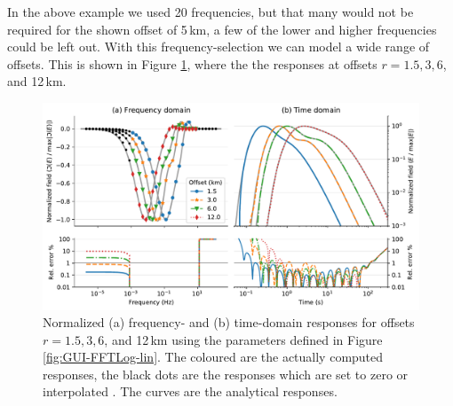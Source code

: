 \documentclass[extra, camera,%
    final,       %
]{gji}
\newlength{\fwidth}
\begin{document}
%
In the above example we used 20 frequencies, but that many would not be
required for the shown offset of 5\,km, a few of the lower and higher
frequencies could be left out. With this frequency-selection we can model a
wide range of offsets. This is shown in Figure \ref{fig:multi-offset}, where
the  the responses at offsets $r=1.5,3,6$, and 12\,km. 
%
\begin{figure}
  \centering
  \includegraphics[width=0.75\fwidth]{03-multi-offset}
  \caption{Normalized (a) frequency- and (b) time-domain responses for offsets
    $r=1.5,3,6$, and 12\,km using the parameters defined in Figure
    \ref{fig:GUI-FFTLog-lin}. The coloured  are the
    actually computed responses, the black dots are the responses which are set
    to zero  or interpolated . The  curves are the analytical
    responses.}
  \label{fig:multi-offset}
\end{figure}
%
\end{document}
